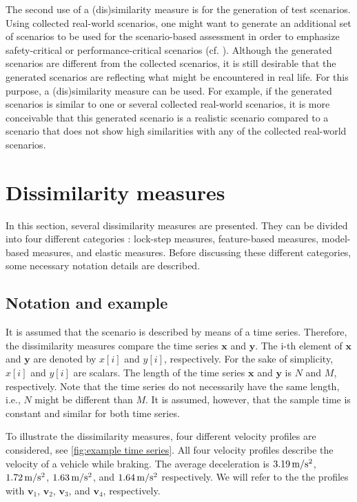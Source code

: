 \documentclass[10pt,final,a4paper,oneside,onecolumn]{article}
\newcommand{\profile}[1]{\textbf{v}_{#1}}
\theoremstyle{plain}\newtheorem{definition}{Definition}[section]    %
\theoremstyle{definition}\newtheorem{example}{Example}[section]     %
\theoremstyle{remark}\newtheorem{remarkenv}{Remark}[section]        %
\begin{document}
The second use of a (dis)similarity measure is for the generation of test scenarios. Using collected real-world scenarios, one might want to generate an additional set of scenarios to be used for the scenario-based assessment in order to emphasize safety-critical or performance-critical scenarios (cf. \cite{zofka2015datadrivetrafficscenarios, deGelder2017assessment}). Although the generated scenarios are different from the collected scenarios, it is still desirable that the generated scenarios are reflecting what might be encountered in real life. For this purpose, a (dis)similarity measure can be used. For example, if the generated scenarios is similar to one or several collected real-world scenarios, it is more conceivable that this generated scenario is a realistic scenario compared to a scenario that does not show high similarities with any of the collected real-world scenarios. 


\section{Dissimilarity measures}
\label{sec:dissimilarity}

In this section, several dissimilarity measures are presented. They can be divided into four different categories \cite{serra2014empirical}: lock-step measures, feature-based measures, model-based measures, and elastic measures. Before discussing these different categories, some necessary notation details are described.

\subsection{Notation and example}
\label{sec:dissimilarity notation}

It is assumed that the scenario is described by means of a time series. Therefore, the dissimilarity measures compare the time series $\textbf{x}$ and $\textbf{y}$. The i-th element of $\textbf{x}$ and $\textbf{y}$ are denoted by $x[i]$ and $y[i]$, respectively. For the sake of simplicity, $x[i]$ and $y[i]$ are scalars. The length of the time series $\textbf{x}$ and $\textbf{y}$ is $N$ and $M$, respectively. Note that the time series do not necessarily have the same length, i.e., $N$ might be different than $M$. It is assumed, however, that the sample time is constant and similar for both time series.

To illustrate the dissimilarity measures, four different velocity profiles are considered, see \cref{fig:example time series}. All four velocity profiles describe the velocity of a vehicle while braking. The average deceleration is $\unit[3.19]{m/s^2}$, $\unit[1.72]{m/s^2}$, $\unit[1.63]{m/s^2}$, and $\unit[1.64]{m/s^2}$ respectively. We will refer to the the profiles with $\profile{1}$, $\profile{2}$, $\profile{3}$, and $\profile{4}$, respectively. 
\end{document}

